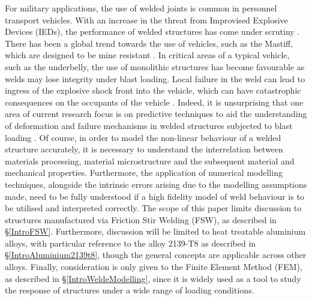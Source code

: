 For military applications, the use of welded joints is common in personnel transport vehicles. With an increase in the threat from Improvised Explosive Devices (IEDs), the performance of welded structures has come under scrutiny \cite{Ramasamy2011}. There has been a global trend towards the use of vehicles, such as the Mastiff, which are designed to be mine resistant \cite{Morse2011}. In critical areas of a typical vehicle, such as the underbelly, the use of monolithic structures has become favourable as welds may lose integrity under blast loading. Local failure in the weld can lead to ingress of the explosive shock front into the vehicle, which can have catastrophic consequences on the occupants of the vehicle \cite{Ramasamy2011}. Indeed, it is unsurprising that one area of current research focus is on predictive techniques to aid the understanding of deformation and failure mechanisms in welded structures subjected to blast loading \cite{McWilliams2013,Grujicic2011a,Grujicic2012}.
Of course, in order to model the non-linear behaviour of a welded structure accurately, it is necessary to understand the interrelation between materials processing, material microstructure and the subsequent material and mechanical properties. Furthermore, the application of numerical modelling techniques, alongside the intrinsic errors arising due to the modelling assumptions made, need to be fully understood if a high fidelity model of weld behaviour is to be utilised and interpreted correctly.
The scope of this paper limits discussion to structures manufactured via Friction Stir Welding (FSW), as described in \S\ref{IntroFSW}. Furthermore, discussion will be limited to heat treatable aluminium alloys, with particular reference to the alloy 2139-T8 as described in \S\ref{IntroAluminium2139t8}, though the general concepts are applicable across other alloys. Finally, consideration is only given to the Finite Element Method (FEM), as described in \S\ref{IntroWeldeModelling}, since it is widely used as a tool to study the response of structures under a wide range of loading conditions.

